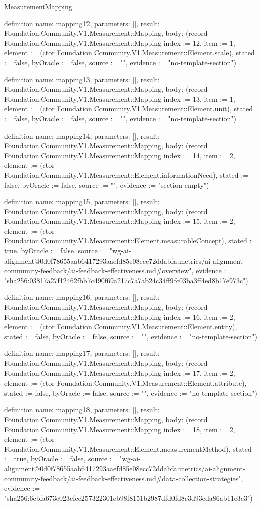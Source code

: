 \begin{lexlean}{MeasurementMapping}
\begin{semanticmodule}
definition{
  name: mapping12,
  parameters: [],
  result: Foundation.Community.V1.Measurement::Mapping,
  body: (record Foundation.Community.V1.Measurement::Mapping {index := 12, item := 1, element := (ctor Foundation.Community.V1.Measurement::Element.scale), stated := false, byOracle := false, source := "", evidence := "no-template-section"})
}

definition{
  name: mapping13,
  parameters: [],
  result: Foundation.Community.V1.Measurement::Mapping,
  body: (record Foundation.Community.V1.Measurement::Mapping {index := 13, item := 1, element := (ctor Foundation.Community.V1.Measurement::Element.unit), stated := false, byOracle := false, source := "", evidence := "no-template-section"})
}

definition{
  name: mapping14,
  parameters: [],
  result: Foundation.Community.V1.Measurement::Mapping,
  body: (record Foundation.Community.V1.Measurement::Mapping {index := 14, item := 2, element := (ctor Foundation.Community.V1.Measurement::Element.informationNeed), stated := false, byOracle := false, source := "", evidence := "section-empty"})
}

definition{
  name: mapping15,
  parameters: [],
  result: Foundation.Community.V1.Measurement::Mapping,
  body: (record Foundation.Community.V1.Measurement::Mapping {index := 15, item := 2, element := (ctor Foundation.Community.V1.Measurement::Element.measurableConcept), stated := true, byOracle := false, source := "wg-ai-alignment@0d0f78655aab6417293aaefd85e08ecc72ddabfa:metrics/ai-alignment-community-feedback/ai-feedback-effectiveness.md#overview", evidence := "sha256:03817a27f12462fbb7c490f69a217c7a7ab24c34ff9fc03ba3ff4ed8b17e973c"})
}

definition{
  name: mapping16,
  parameters: [],
  result: Foundation.Community.V1.Measurement::Mapping,
  body: (record Foundation.Community.V1.Measurement::Mapping {index := 16, item := 2, element := (ctor Foundation.Community.V1.Measurement::Element.entity), stated := false, byOracle := false, source := "", evidence := "no-template-section"})
}

definition{
  name: mapping17,
  parameters: [],
  result: Foundation.Community.V1.Measurement::Mapping,
  body: (record Foundation.Community.V1.Measurement::Mapping {index := 17, item := 2, element := (ctor Foundation.Community.V1.Measurement::Element.attribute), stated := false, byOracle := false, source := "", evidence := "no-template-section"})
}

definition{
  name: mapping18,
  parameters: [],
  result: Foundation.Community.V1.Measurement::Mapping,
  body: (record Foundation.Community.V1.Measurement::Mapping {index := 18, item := 2, element := (ctor Foundation.Community.V1.Measurement::Element.measurementMethod), stated := true, byOracle := false, source := "wg-ai-alignment@0d0f78655aab6417293aaefd85e08ecc72ddabfa:metrics/ai-alignment-community-feedback/ai-feedback-effectiveness.md#data-collection-strategies", evidence := "sha256:6cbfa673e023cfce257322301eb98f8151b2987dfd0fd8c3d93eda86ab11e3c3"})
}


\end{semanticmodule}
\end{lexlean}
